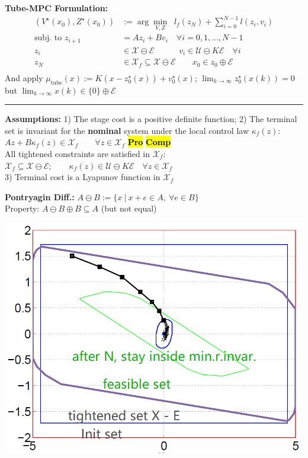\documentclass[10pt,a4paper,landscape]{article}
\newcommand{\hlc}[2][yellow]{ {\sethlcolor{#1} \hl{#2}} }
\newcommand{\quadRule}{\vspace{-3pt}\rule{0.23\textwidth}{0.4pt}}
\newcommand{\comp}{\footnotesize{\hlc[cyan]{\textbf{Comp}}}} %
\newcommand{\prove}{\footnotesize{\hlc[pink]{\textbf{Pro}}}} %
\begin{document}
\begin{multicols*}{4}
\textbf{Tube-MPC Formulation:}
\begin{equation*}
	\begin{aligned}
		(V^\star(x_0), Z^\star(x_0)) &:= \arg\min_{V,Z} \;\; l_f(z_N) + \sum_{i=0}^{N-1} l(z_i, v_i)\\
		\text{subj. to } z_{i+1} &= Az_i + Bv_i \quad \forall i = 0,1,\ldots, N-1\\
		z_i &\in \mathcal{X} \ominus \mathcal{E} \qquad \quad v_i \in \mathcal{U} \ominus K\mathcal{E} \quad \forall i\\
		z_N &\in \mathcal{X}_f \subseteq \mathcal{X}\ominus \mathcal{E}\qquad x_0 \in z_0 \oplus \mathcal{E}\\
	\end{aligned}
\end{equation*}
And apply $\mu_{\mathrm{tube}}(x):= K (x - z_0^\star(x)) + v_0^\star(x)$; 
$\lim_{k\to\infty} z^\star_0(x(k)) = 0$ but $\lim_{k\to\infty} x(k) \in \{0\} \oplus \mathcal{E} $

\quadRule

\textbf{Assumptions:} 1) The stage cost is a positive definite function;
	2) The terminal set is invariant for the \textbf{nominal} system under the local control law $\kappa_f(z)$:\\
	$Az+B\kappa_f(z) \in \mathcal{X}_f \qquad \forall z \in \mathcal{X}_f$  \prove \comp \\
	All tightened constraints are satisfied in $\mathcal{X}_f$:
	$\mathcal{X}_f \subseteq  \mathcal{X} \ominus \mathcal{E}; \qquad
	\kappa_f(z) \in \mathcal{U} \ominus K\mathcal{E} \quad \forall z \in \mathcal{X}_f$\\
	3) Terminal cost is a Lyapunov function in $\mathcal{X}_f$

\textbf{Pontryagin Diff.:} $ A \ominus B := \{ x \:|\: x+e \in A, \: \forall e \in B \}$ \\
Property: $A \ominus B \oplus B \subseteq A$ (but not equal)\\

\vspace{-5pt}
\begin{colfig}
    \centering
    \includegraphics[width=0.65\linewidth]{images/tube3.png}
    \vspace{-5pt}
\end{colfig}


\end{multicols*}
\end{document}
